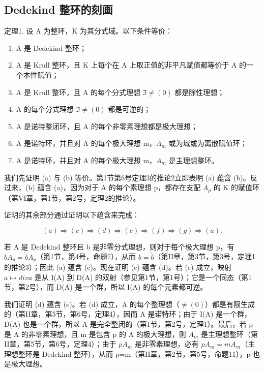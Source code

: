 \subsection{Dedekind 整环的刻画}

定理1. 设 A 为整环，K 为其分式域。以下条件等价：

\begin{enumerate}
\def\labelenumi{(\alph{enumi})}
\item
  A 是 Dedekind 整环；
\item
  A 是 Krull 整环，且 K 上每个在 A 上取正值的非平凡赋值都等价于 A 的一个本性赋值；
\item
  A 是 Krull 整环，且 A 的每个分式理想 \(\Im \neq (0)\) 都是除性理想；
\item
  A 的每个分式理想 \(\Im \neq (0)\) 都是可逆的；
\item
  A 是诺特整闭环，且 A 的每个非零素理想都是极大理想；
\item
  A 是诺特环，并且对 A 的每个极大理想 m，\(A_{m}\) 或为域或为离散赋值环；
\item
  A 是诺特环，并且对 A 的每个极大理想 m，\(A_{m}\) 是主理想整环。
\end{enumerate}

我们先证明 (a) 与 (b) 等价。第1节第6号定理3的推论2立即表明 (a) 蕴含 (b)。反过来，(b) 蕴含 (a)，因为对于 A 的每个素理想 p，都存在支配 \(A_{p}\) 的 K 的赋值环（第VI章，第1节，第2号，定理2的推论）。

证明的其余部分通过证明以下蕴含来完成：

\[
(a) \Rightarrow (c) \Rightarrow (d) \Rightarrow (e) \Rightarrow (f) \Rightarrow (g) \Rightarrow (a).
\]

若 A 是 Dedekind 整环且 b 是非零分式理想，则对于每个极大理想 p，有 \(bA_{p} = \tilde{b}A_{p}\)（第1节，第4号，命题7），从而 \(b = \tilde{b}\)（第II章，第3节，第3号，定理1的推论3）；因此 (a) 蕴含 (c)。现在证明 (c) 蕴含 (d)。若 (c) 成立，映射 \(a \mapsto div a\) 是从 I(A) 到 D(A) 的双射（参见第1节，第1号）；它是一个同态（第1节，第2号），而 D(A) 是一个群，所以 I(A) 的每个元素都可逆。

我们证明 (d) 蕴含 (e)。若 (d) 成立，A 的每个整理想（\(\neq(0)\)）都是有限生成的（第II章，第5节，第6号，定理4），因而 A 是诺特环；由于 I(A) 是一个群，D(A) 也是一个群，所以 A 是完全整闭的（第1节，第2号，定理1）。最后，若 p 是 A 的非零素理想，且 m 是包含 p 的 A 的极大理想，则 \(A_{m}\) 是主理想整环（第II章，第5节，第6号，定理4）；由于 \(pA_{m}\) 是非零素理想，必有 \(pA_{m}=mA_{m}\)（主理想整环是 Dedekind 整环），从而 p=m（第II章，第2节，第5号，命题11），p 也是极大理想。

